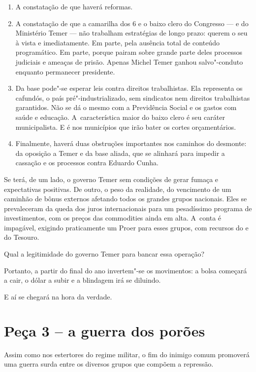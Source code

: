 \begin{enumerate}
\itemsep1pt\parskip0pt
\item
  A constatação de que  haverá reformas.
\item
  A constatação de que a camarilha dos 6 e o baixo clero do Congresso
  --- e do Ministério Temer --- não trabalham estratégias de longo
  prazo: querem o seu à vista e imediatamente. Em parte, pela ausência
  total de conteúdo programático. Em parte, porque pairam sobre grande
  parte deles processos judiciais e ameaças de prisão. Apenas Michel
  Temer ganhou salvo"-conduto enquanto permanecer presidente.
\item
  Da base pode"-se esperar leis contra direitos trabalhistas. Ela
  representa os cafundós, o país pré"-industrializado, sem sindicatos nem
  direitos trabalhistas garantidos. Não se dá o mesmo com a Previdência
  Social e os gastos com saúde e educação. A~característica maior do
  baixo clero é seu caráter municipalista. E é nos municípios que irão
  bater os cortes orçamentários.
\item
  Finalmente, haverá duas obstruções importantes nos caminhos do
  desmonte: da oposição a Temer e da base aliada, que se alinhará para
  impedir a cassação e os processos contra Eduardo Cunha.
\end{enumerate}

Se terá, de um lado, o governo Temer sem condições de gerar fumaça e
expectativas positivas. De outro, o peso da realidade, do vencimento de
um caminhão de bônus externos afetando todos os grandes grupos
nacionais. Eles se prevaleceram da queda dos juros internacionais para
um pesadíssimo programa de investimentos, com os preços das commodities
ainda em alta. A~conta é impagável, exigindo praticamente um Proer para
esses grupos, com recursos do  e do Tesouro.

Qual a legitimidade do governo Temer para bancar essa operação?

Portanto, a partir do final do ano invertem"-se os movimentos: a bolsa
começará a cair, o dólar a subir e a blindagem irá se diluindo.

E aí se chegará na hora da verdade.

\section{Peça 3 -- a guerra dos porões}

Assim como nos estertores do regime militar, o fim do inimigo comum
promoverá uma guerra surda entre os diversos grupos que compõem a
repressão.

